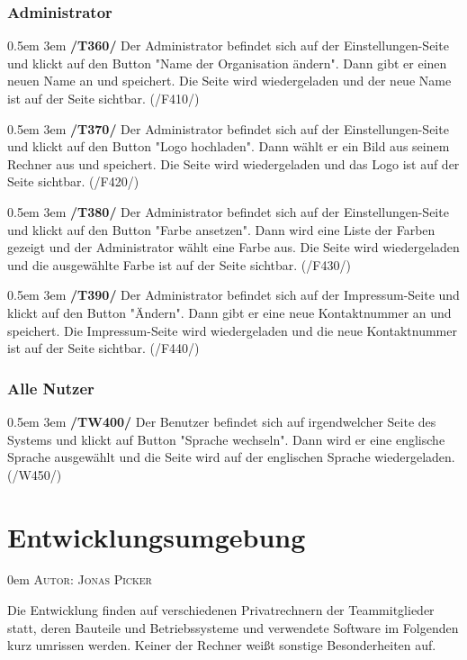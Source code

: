 \documentclass{article}
\makeatletter
\newcommand{\sectionauthor}[1]{
	{\parindent 0em \large \scshape Autor: #1 \par \nobreak \vspace*{2em}}
	\@afterheading
}
\newcommand{\specification}[3]{
	{\parindent 0.5em \hangindent 3em \hypertarget{spec:#1:#2}{\textbf{/#1#2/}} #3 \par \nobreak \vspace*{0.5em}}
}
\makeatother
\begin{document}
		\subsubsection{Administrator}
			\specification{T}{360}{Der Administrator befindet sich auf der Einstellungen-Seite und klickt auf den Button "Name der Organisation ändern". Dann gibt er einen neuen Name an und speichert. 
				Die Seite wird wiedergeladen und der neue Name ist auf der Seite sichtbar. (/F410/) }
			\specification{T}{370}{Der Administrator befindet sich auf der Einstellungen-Seite und klickt auf den Button "Logo hochladen". Dann wählt er ein Bild aus seinem Rechner aus und speichert. 
				Die Seite wird wiedergeladen und das Logo ist auf der Seite sichtbar. (/F420/)}
			\specification{T}{380}{Der Administrator befindet sich auf der Einstellungen-Seite und klickt auf den Button "Farbe ansetzen". Dann wird eine Liste der Farben gezeigt und der Administrator wählt eine Farbe aus. 
				Die Seite wird wiedergeladen und die ausgewählte Farbe ist auf der Seite sichtbar. (/F430/)}
			\specification{T}{390}{Der Administrator befindet sich auf der Impressum-Seite und klickt auf den Button "Ändern". Dann gibt er eine neue Kontaktnummer an und speichert. 
				Die Impressum-Seite wird wiedergeladen und die neue Kontaktnummer ist auf der Seite sichtbar. (/F440/)}
		\subsubsection{Alle Nutzer}
			\specification{TW}{400}{Der Benutzer befindet sich auf irgendwelcher Seite des Systems und klickt auf Button "Sprache wechseln". 
				Dann wird er eine englische Sprache ausgewählt und die Seite wird auf der englischen Sprache wiedergeladen. (/W450/) }

\section{Entwicklungsumgebung} %
\sectionauthor{Jonas Picker}
Die Entwicklung finden auf verschiedenen Privatrechnern der Teammitglieder statt, deren Bauteile und Betriebssysteme und verwendete Software im Folgenden kurz umrissen werden. Keiner der Rechner weißt sonstige Besonderheiten auf. 
\end{document}
